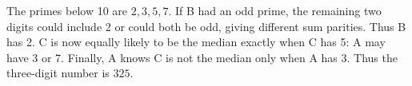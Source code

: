 The primes below 10 are $2,3,5,7$. If B had an odd prime, the remaining two digits could include 2 or could both be odd, giving different sum parities. Thus B has 2. C is now equally likely to be the median exactly when C has 5: A may have 3 or 7. Finally, A knows C is not the median only when A has 3. Thus the three-digit number is $\boxed{325}$.
